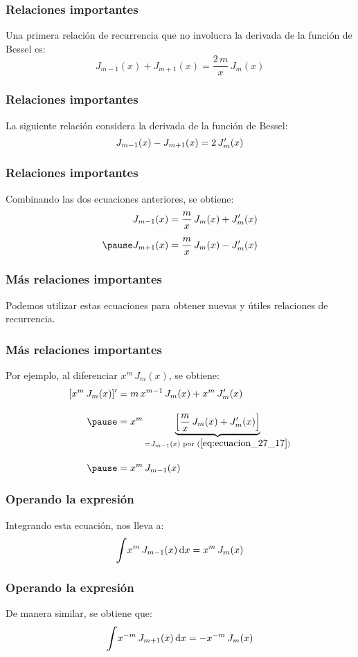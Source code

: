 \documentclass[12pt]{beamer}
\begin{document}
\begin{frame}
\frametitle{Relaciones importantes}
Una primera relación de recurrencia que no involucra la derivada de la función de Bessel es:
\pause
\begin{equation}
J_{m-1} (x) + J_{m+1} (x) = \dfrac{2 \, m}{x} \, J_{m} (x)
\label{eq:ecuacion_27_15}
\end{equation}
\end{frame}
\begin{frame}
\frametitle{Relaciones importantes}    
La siguiente relación considera la derivada de la función de Bessel:
\pause
\begin{equation}
J_{m-1} (x) - J_{m+1} (x) = 2 \, {J}^{\prime}_{m} (x)
\label{eq:ecuacion_27_16}
\end{equation}
\end{frame}
\begin{frame}
\frametitle{Relaciones importantes}    
Combinando las dos ecuaciones anteriores, se obtiene:
\pause
\begin{eqnarray}
\begin{aligned}
J_{m-1}(x) &= \dfrac{m}{x} \, J_{m} (x) + \pderivada{J}_{m} (x) \\[0.5em] \pause
J_{m+1}(x) &= \dfrac{m}{x} \, J_{m} (x) - \pderivada{J}_{m} (x)
\end{aligned}
\label{eq:ecuacion_27_17}
\end{eqnarray}
\end{frame}
\begin{frame}
\frametitle{Más relaciones importantes}    
Podemos utilizar estas ecuaciones para obtener nuevas y útiles relaciones de recurrencia.
\end{frame}
\begin{frame}
\frametitle{Más relaciones importantes}
Por ejemplo, al diferenciar $x^{m} \, J_{m} (x)$, se obtiene:
\pause
\begin{eqnarray*}
\begin{aligned}
[x^{m} \, J_{m} (x)]^{\prime} &= m \, x^{m-1} \, J_{m} (x) + x^{m} \, \pderivada{J}_{m} (x) \\[1em] \pause
&= x^{m} \underbrace{ \left[ \dfrac{m}{x} \, J_{m} (x) + \pderivada{J}_{m} (x)\right]}_{=J_{m-1}(x) \text{ por } (\ref{eq:ecuacion_27_17})}  \\[1em] \pause
&= x^{m} \, J_{m-1} (x)
\end{aligned}
\end{eqnarray*}
\end{frame}
\begin{frame}
\frametitle{Operando la expresión}    
Integrando esta ecuación, nos lleva a:
\pause
\begin{equation}
\scaleint{6ex} x^{m} \, J_{m-1} (x) \dd{x} = x^{m} \, J_{m} (x)
\label{eq:ecuacion_27_18}
\end{equation}
\end{frame}
\begin{frame}
\frametitle{Operando la expresión}    
De manera similar, se obtiene que:
\pause
\begin{equation}
\scaleint{6ex} x^{-m} \, J_{m+1} (x) \dd{x} = -x^{-m} \, J_{m} (x)
\label{eq:ecuacion_27_19}
\end{equation}
\end{frame}
\end{document}

